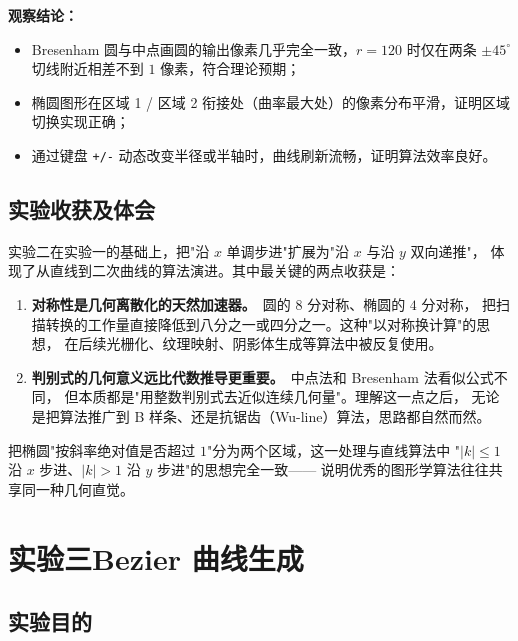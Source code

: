 \documentclass[a4paper,12pt]{ctexart}
\begin{document}
\textbf{观察结论：}
\begin{itemize}[leftmargin=2em,itemsep=0.2em]
    \item Bresenham 圆与中点画圆的输出像素几乎完全一致，$r=120$ 时仅在两条 $\pm 45^\circ$
        切线附近相差不到 $1$ 像素，符合理论预期；
    \item 椭圆图形在区域 1 / 区域 2 衔接处（曲率最大处）的像素分布平滑，证明区域切换实现正确；
    \item 通过键盘 \texttt{+/-} 动态改变半径或半轴时，曲线刷新流畅，证明算法效率良好。
\end{itemize}

\subsection{实验收获及体会}

实验二在实验一的基础上，把"沿 $x$ 单调步进"扩展为"沿 $x$ 与沿 $y$ 双向递推"，
体现了从直线到二次曲线的算法演进。其中最关键的两点收获是：

\begin{enumerate}[leftmargin=2em,itemsep=0.2em]
    \item \textbf{对称性是几何离散化的天然加速器。}\ 圆的 $8$ 分对称、椭圆的 $4$ 分对称，
        把扫描转换的工作量直接降低到八分之一或四分之一。这种"以对称换计算"的思想，
        在后续光栅化、纹理映射、阴影体生成等算法中被反复使用。
    \item \textbf{判别式的几何意义远比代数推导更重要。}\ 中点法和 Bresenham 法看似公式不同，
        但本质都是"用整数判别式去近似连续几何量"。理解这一点之后，
        无论是把算法推广到 B 样条、还是抗锯齿（Wu-line）算法，思路都自然而然。
\end{enumerate}

把椭圆"按斜率绝对值是否超过 $1$"分为两个区域，这一处理与直线算法中
"$|k|\le 1$ 沿 $x$ 步进、$|k|>1$ 沿 $y$ 步进"的思想完全一致——
说明优秀的图形学算法往往共享同一种几何直觉。

\clearpage
\section{实验三\quad Bezier 曲线生成}

\subsection{实验目的}
\end{document}
